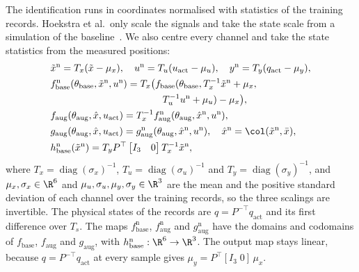 The identification runs in coordinates normalised with statistics of the
training records.
Hoekstra et al.\ only scale the signals and take the state scale from a
simulation of the baseline~\cite[Sec.~5.3]{hoekstra2026lfr}.
We also centre every channel and take the state statistics from the measured
positions:
{\small
\begin{equation}
\begin{aligned}
 &\tilde x^{\mathrm n}=T_x(\tilde x-\mu_x),\quad
  u^{\mathrm n}=T_u(u_{\mathrm{act}}-\mu_u),\quad
  y^{\mathrm n}=T_y(q_{\mathrm{act}}-\mu_y),\\
 &f^{\mathrm n}_{\mathrm{base}}(\theta_{\mathrm{base}},\tilde x^{\mathrm n},u^{\mathrm n})
  =T_x\bigl(f_{\mathrm{base}}(\theta_{\mathrm{base}},T_x^{-1}\tilde x^{\mathrm n}+\mu_x,\\
 &\hspace{11.5em}T_u^{-1}u^{\mathrm n}+\mu_u)-\mu_x\bigr),\\
 &f_{\mathrm{aug}}(\theta_{\mathrm{aug}},\hat x,u_{\mathrm{act}})
  =T_x^{-1}f^{\mathrm n}_{\mathrm{aug}}(\theta_{\mathrm{aug}},\hat x^{\mathrm n},u^{\mathrm n}),\\
 &g_{\mathrm{aug}}(\theta_{\mathrm{aug}},\hat x,u_{\mathrm{act}})
  =g^{\mathrm n}_{\mathrm{aug}}(\theta_{\mathrm{aug}},\hat x^{\mathrm n},u^{\mathrm n}),\quad
  \hat x^{\mathrm n}=\col(\tilde x^{\mathrm n},\bar x),\\
 &h^{\mathrm n}_{\mathrm{base}}(\tilde x^{\mathrm n})
  =T_yP^\top\begin{bmatrix}I_3&0\end{bmatrix}T_x^{-1}\tilde x^{\mathrm n},
\end{aligned}
\label{eq:aug_norm}
\end{equation}
}
where $T_x=\operatorname{diag}(\sigma_x)^{-1}$,
$T_u=\operatorname{diag}(\sigma_u)^{-1}$ and
$T_y=\operatorname{diag}(\sigma_y)^{-1}$, and $\mu_x,\sigma_x\in\R^6$ and
$\mu_u,\sigma_u,\mu_y,\sigma_y\in\R^3$ are the mean and the positive standard
deviation of each channel over the training records, so the three scalings
are invertible.
The physical states of the records are $q=P^{-\top}q_{\mathrm{act}}$ and its
first difference over $T_s$.
The maps $f^{\mathrm n}_{\mathrm{base}}$, $f^{\mathrm n}_{\mathrm{aug}}$ and
$g^{\mathrm n}_{\mathrm{aug}}$ have the domains and codomains of
$f_{\mathrm{base}}$, $f_{\mathrm{aug}}$ and $g_{\mathrm{aug}}$, with
$h^{\mathrm n}_{\mathrm{base}}:\R^6\to\R^3$.
The output map stays linear, because $q=P^{-\top}q_{\mathrm{act}}$ at every
sample gives $\mu_y=P^\top[I_3\;0]\,\mu_x$.

